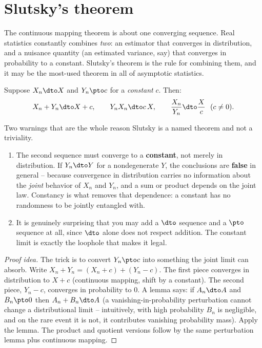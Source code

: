 \section{Slutsky's theorem}
\label{ch22:slutsky}

The continuous mapping theorem is about one converging sequence. Real statistics
constantly combines \emph{two}: an estimator that converges in distribution, and a
nuisance quantity (an estimated variance, say) that converges in probability to a
constant. Slutsky's theorem is the rule for combining them, and it may be the
most-used theorem in all of asymptotic statistics.

\begin{theorem}[Slutsky]
\label{ch22:thm-slutsky}
Suppose $X_n\dto X$ and $Y_n\pto c$ for a \emph{constant} $c$. Then:
\[
  X_n + Y_n \dto X + c,\qquad
  Y_n X_n \dto c\,X,\qquad
  \frac{X_n}{Y_n}\dto\frac{X}{c}\ \ (c\ne0).
\]
\end{theorem}

\begin{focusbox}
Two warnings that are the whole reason Slutsky is a named theorem and not a triviality.
\begin{enumerate}
\item The second sequence must converge to a \textbf{constant}, not merely in
      distribution. If $Y_n\dto Y$ for a nondegenerate $Y$, the conclusions are
      \textbf{false} in general -- because convergence in distribution carries no
      information about the \emph{joint} behavior of $X_n$ and $Y_n$, and a sum or
      product depends on the joint law. Constancy is what removes that dependence:
      a constant has no randomness to be jointly entangled with.
\item It is genuinely surprising that you may add a $\dto$ sequence and a $\pto$
      sequence at all, since $\dto$ alone does not respect addition. The constant limit
      is exactly the loophole that makes it legal.
\end{enumerate}
\end{focusbox}

\begin{proof}[Proof idea]
The trick is to convert $Y_n\pto c$ into something the joint limit can absorb. Write
$X_n + Y_n = (X_n + c) + (Y_n - c)$. The first piece converges in distribution to
$X+c$ (continuous mapping, shift by a constant). The second piece, $Y_n - c$,
converges in probability to $0$. A lemma says: if $A_n\dto A$ and $B_n\pto0$ then
$A_n + B_n\dto A$ (a vanishing-in-probability perturbation cannot change a
distributional limit -- intuitively, with high probability $B_n$ is negligible, and
on the rare event it is not, it contributes vanishing probability mass). Apply the
lemma. The product and quotient versions follow by the same perturbation lemma plus
continuous mapping.
\end{proof}

